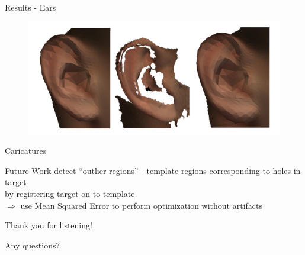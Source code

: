 \documentclass[xcolor=x11names,compress]{beamer}
\begin{document}
\begin{frame}{Results - Ears}
    \begin{figure}
        \centering
        \includegraphics[width=.8\textwidth]{../resources/img/00029_left_ear_comparison.pdf}
    \end{figure}
\end{frame}

\begin{frame}{Caricatures}
\end{frame}

\begin{frame}{Future Work}
    detect ``outlier regions'' - template regions corresponding to holes in target\\
    by registering target on to template\\
    $\Rightarrow$ use Mean Squared Error to perform optimization without artifacts
\end{frame}
\begin{frame}{Thank you for listening!}
    \begin{center}
    \Large Any questions? 
    \end{center}
\end{frame}
\end{document}
